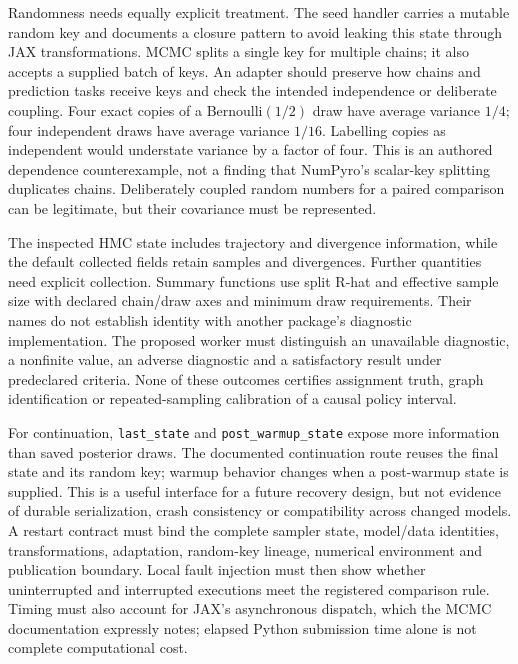 Randomness needs equally explicit treatment. The seed handler carries a mutable random key and documents a closure pattern to avoid leaking this state through JAX transformations. MCMC splits a single key for multiple chains; it also accepts a supplied batch of keys. An adapter should preserve how chains and prediction tasks receive keys and check the intended independence or deliberate coupling. Four exact copies of a Bernoulli$(1/2)$ draw have average variance $1/4$; four independent draws have average variance $1/16$. Labelling copies as independent would understate variance by a factor of four. This is an authored dependence counterexample, not a finding that NumPyro's scalar-key splitting duplicates chains. Deliberately coupled random numbers for a paired comparison can be legitimate, but their covariance must be represented. \cite{exec23_numpyro_sources,exec23_numpyro_reference}

The inspected HMC state includes trajectory and divergence information, while the default collected fields retain samples and divergences. Further quantities need explicit collection. Summary functions use split R-hat and effective sample size with declared chain/draw axes and minimum draw requirements. Their names do not establish identity with another package's diagnostic implementation. The proposed worker must distinguish an unavailable diagnostic, a nonfinite value, an adverse diagnostic and a satisfactory result under predeclared criteria. None of these outcomes certifies assignment truth, graph identification or repeated-sampling calibration of a causal policy interval. \cite{exec23_numpyro_sources}

For continuation, \texttt{last\_state} and \texttt{post\_warmup\_state} expose more information than saved posterior draws. The documented continuation route reuses the final state and its random key; warmup behavior changes when a post-warmup state is supplied. This is a useful interface for a future recovery design, but not evidence of durable serialization, crash consistency or compatibility across changed models. A restart contract must bind the complete sampler state, model/data identities, transformations, adaptation, random-key lineage, numerical environment and publication boundary. Local fault injection must then show whether uninterrupted and interrupted executions meet the registered comparison rule. Timing must also account for JAX's asynchronous dispatch, which the MCMC documentation expressly notes; elapsed Python submission time alone is not complete computational cost. \cite{exec23_numpyro_sources}

